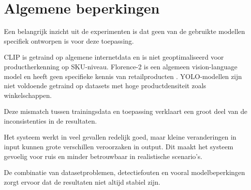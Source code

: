 \section{Algemene beperkingen}

Een belangrijk inzicht uit de experimenten is dat geen van de gebruikte modellen specifiek ontworpen is voor deze toepassing.

CLIP is getraind op algemene internetdata \cite{DBLP:journals/corr/abs-2103-00020} en is niet geoptimaliseerd voor productherkenning op SKU-niveau. Florence-2 is een algemeen vision-language model en heeft geen specifieke kennis van retailproducten \cite{xiao2023florence2advancingunifiedrepresentation}. YOLO-modellen zijn niet voldoende getraind op datasets met hoge productdensiteit zoals winkelschappen.

Deze mismatch tussen trainingsdata en toepassing verklaart een groot deel van de inconsistenties in de resultaten.

Het systeem werkt in veel gevallen redelijk goed, maar kleine veranderingen in input kunnen grote verschillen veroorzaken in output. Dit maakt het systeem gevoelig voor ruis en minder betrouwbaar in realistische scenario's.

De combinatie van datasetproblemen, detectiefouten en vooral modelbeperkingen zorgt ervoor dat de resultaten niet altijd stabiel zijn.